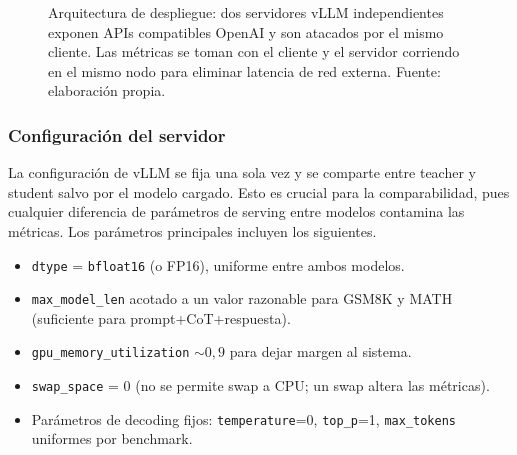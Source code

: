 \documentclass[11pt,a4paper]{article}
\begin{document}
\begin{figure}[H]
\centering
{}
\caption{Arquitectura de despliegue: dos servidores vLLM independientes exponen APIs compatibles OpenAI y son atacados por el mismo cliente. Las métricas se toman con el cliente y el servidor corriendo en el mismo nodo para eliminar latencia de red externa. Fuente: elaboración propia.}
\label{fig:arq-serving}
\end{figure}

\subsubsection{Configuración del servidor}

La configuración de vLLM se fija una sola vez y se comparte entre teacher y student salvo por el modelo cargado. Esto es crucial para la comparabilidad, pues cualquier diferencia de parámetros de serving entre modelos contamina las métricas. Los parámetros principales incluyen los siguientes.
\begin{itemize}[nosep,leftmargin=*]
\item \texttt{dtype} = \texttt{bfloat16} (o FP16), uniforme entre ambos modelos.
\item \texttt{max\_model\_len} acotado a un valor razonable para GSM8K y MATH (suficiente para prompt+CoT+respuesta).
\item \texttt{gpu\_memory\_utilization} $\sim 0{,}9$ para dejar margen al sistema.
\item \texttt{swap\_space} = 0 (no se permite swap a CPU; un swap altera las métricas).
\item Parámetros de decoding fijos: \texttt{temperature}=0, \texttt{top\_p}=1, \texttt{max\_tokens} uniformes por benchmark.
\end{itemize}
\end{document}
